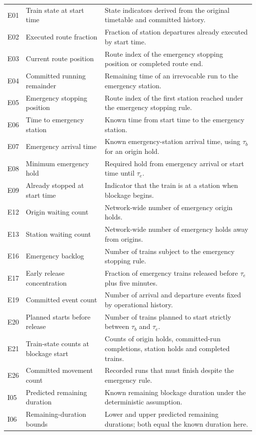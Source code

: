 \begin{longtable}{@{}>{\raggedright\arraybackslash}p{0.8cm}>{\raggedright\arraybackslash}p{3.7cm}>{\raggedright\arraybackslash}p{10.0cm}@{}}
E01 & Train state at start time & State indicators derived from the original timetable and committed history. \\
E02 & Executed route fraction & Fraction of station departures already executed by start time. \\
E03 & Current route position & Route index of the emergency stopping position or completed route end. \\
E04 & Committed running remainder & Remaining time of an irrevocable run to the emergency station. \\
E05 & Emergency stopping position & Route index of the first station reached under the emergency stopping rule. \\
E06 & Time to emergency station & Known time from start time to the emergency station. \\
E07 & Emergency arrival time & Known emergency-station arrival time, using $\tau_b$ for an origin hold. \\
E08 & Minimum emergency hold & Required hold from emergency arrival or start time until $\tau_e$. \\
E09 & Already stopped at start time & Indicator that the train is at a station when blockage begins. \\
E12 & Origin waiting count & Network-wide number of emergency origin holds. \\
E13 & Station waiting count & Network-wide number of emergency holds away from origins. \\
E16 & Emergency backlog & Number of trains subject to the emergency stopping rule. \\
E17 & Early release concentration & Fraction of emergency trains released before $\tau_e$ plus five minutes. \\
E19 & Committed event count & Number of arrival and departure events fixed by operational history. \\
E20 & Planned starts before release & Number of trains planned to start strictly between $\tau_b$ and $\tau_e$. \\
E21 & Train-state counts at blockage start & Counts of origin holds, committed-run completions, station holds and completed trains. \\
E26 & Committed movement count & Recorded runs that must finish despite the emergency rule. \\
I05 & Predicted remaining duration & Known remaining blockage duration under the deterministic assumption. \\
I06 & Remaining-duration bounds & Lower and upper predicted remaining durations; both equal the known duration here. \\

\end{longtable}
